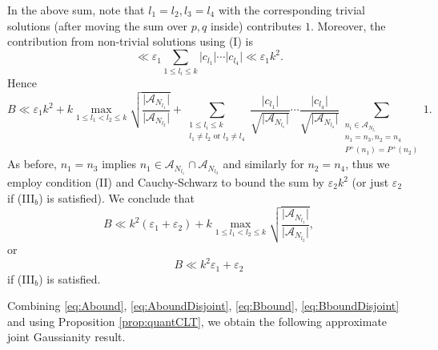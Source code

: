 \documentclass[11pt]{tran-l}
\theoremstyle{definition}
\theoremstyle{remark}
\numberwithin{equation}{section}
\begin{document}
In the above sum, note that $l_1=l_2, l_3 = l_4$ with the corresponding trivial solutions (after moving the sum over $p, q$ inside) contributes $1$. Moreover, the contribution from non-trivial solutions using (I) is 
\begin{equation*}
\ll\varepsilon_1 \sum_{1\leq l_i\leq k} \lvert c_{l_1}\rvert\cdots \lvert {c}_{l_4}\rvert \ll \varepsilon_1 k^2.
\end{equation*} Hence 
\begin{equation*}
     B \ll \varepsilon_1k^2 + k\max_{1\leq l_1<l_2\leq k} \sqrt{\frac{\lvert \mathcal A_{N_{l_1}}\rvert}{\lvert \mathcal A_{N_{l_2}}\rvert}} +  \sum_{\substack{1\leq l_i\leq k \\ l_1\neq l_2 \text{ or } l_3\neq l_4}} \frac{\lvert c_{l_1}\rvert}{\sqrt{\lvert \mathcal A_{N_{l_1}}\rvert}}\cdots \frac{\lvert {c}_{l_4}\rvert}{\sqrt{\lvert \mathcal A_{N_{l_4}}\rvert}}\sum_{\substack{n_i\in\mathcal A_{N_{l_i}} \\ n_1=n_3, n_2 = n_4 \\ P^+(n_1) = P^+(n_2) }} 1.
\end{equation*}
As before, $n_1=n_3$ implies $n_1\in\mathcal A_{N_{l_1}}\cap \mathcal A_{N_{l_3}}$ and similarly for $n_2=n_4$, thus we employ condition (II) and Cauchy-Schwarz to bound the sum by $\varepsilon_2k^2$ (or just $\varepsilon_2$ if (III$_b$) is satisfied). We conclude that
\begin{equation}\label{eq:Bbound}
B \ll k^2(\varepsilon_1 + \varepsilon_2) + k \max_{1\leq l_1<l_2\leq k} \sqrt{\frac{\lvert \mathcal A_{N_{l_1}}\rvert}{\lvert \mathcal A_{N_{l_2}}\rvert}},
\end{equation}
or 
\begin{equation}\label{eq:BboundDisjoint}
B \ll  k^2\varepsilon_1  + \varepsilon_2
\end{equation}
if (III$_b$) is satisfied.

Combining \eqref{eq:Abound}, \eqref{eq:AboundDisjoint}, \eqref{eq:Bbound}, \eqref{eq:BboundDisjoint} and using Proposition \ref{prop:quantCLT},
we obtain the following approximate joint Gaussianity result. 
\end{document}
